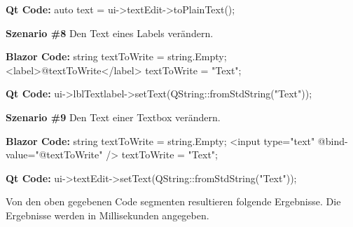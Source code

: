 \begin{zitat}
    \textbf{Qt Code:}
    \newline
    auto text = ui->textEdit->toPlainText();
\end{zitat}
\newline
\newline

\textbf{Szenario \#8}
\newline
Den Text eines Labels verändern.

\begin{zitat}
    \textbf{Blazor Code:}
    \newline
    string textToWrite = string.Empty;
    \newline
    <label>@textToWrite</label>
    \newline
    textToWrite = "Text";
\end{zitat}

\begin{zitat}
    \textbf{Qt Code:}
    \newline
    ui->lblTextlabel->setText(QString::fromStdString("Text"));
\end{zitat}
\newline
\newline

\textbf{Szenario \#9}
\newline
Den Text einer Textbox verändern.

\begin{zitat}
    \textbf{Blazor Code:}
    \newline
    string textToWrite = string.Empty;
    \newline
    <input type="text" @bind-value="@textToWrite" />
    \newline
    textToWrite = "Text";
\end{zitat}

\begin{zitat}
    \textbf{Qt Code:}
    \newline
    ui->textEdit->setText(QString::fromStdString("Text"));
\end{zitat}

Von den oben gegebenen Code segmenten resultieren folgende Ergebnisse. Die Ergebnisse werden in
Millisekunden angegeben.

